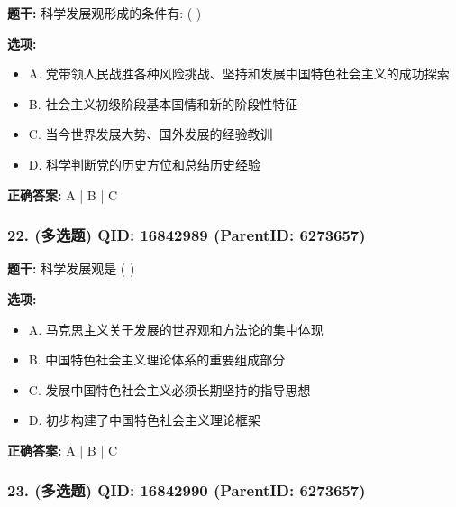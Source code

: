 \documentclass[12pt,UTF8]{ctexart}
\begin{document}
\textbf{题干:}
科学发展观形成的条件有: ( )



\textbf{选项:}
\begin{itemize}[leftmargin=*]

  \item A. 党带领人民战胜各种风险挑战、坚持和发展中国特色社会主义的成功探索

  \item B. 社会主义初级阶段基本国情和新的阶段性特征

  \item C. 当今世界发展大势、国外发展的经验教训

  \item D. 科学判断党的历史方位和总结历史经验

\end{itemize}

\textbf{正确答案:}
A | B | C

\vspace{0.3em}\hrulefill\vspace{0.7em}

\subsubsection*{22. (多选题) \small QID: 16842989 (ParentID: 6273657)}

\textbf{题干:}
科学发展观是 ( )



\textbf{选项:}
\begin{itemize}[leftmargin=*]

  \item A. 马克思主义关于发展的世界观和方法论的集中体现

  \item B. 中国特色社会主义理论体系的重要组成部分

  \item C. 发展中国特色社会主义必须长期坚持的指导思想

  \item D. 初步构建了中国特色社会主义理论框架

\end{itemize}

\textbf{正确答案:}
A | B | C

\vspace{0.3em}\hrulefill\vspace{0.7em}

\subsubsection*{23. (多选题) \small QID: 16842990 (ParentID: 6273657)}
\end{document}
